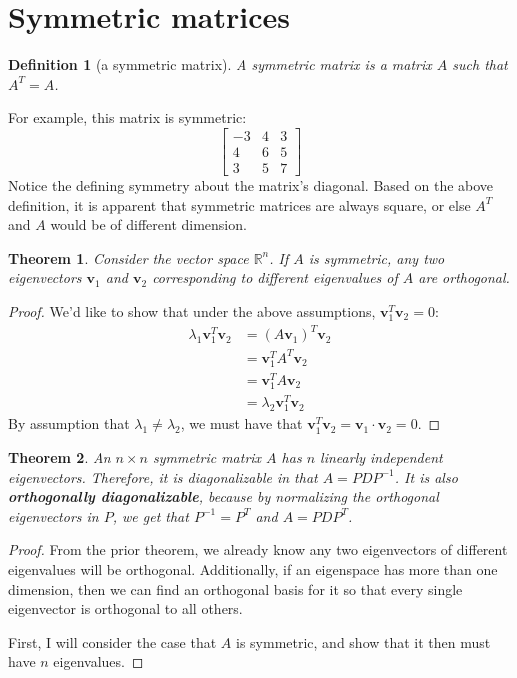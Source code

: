 \documentclass[draft,12pt]{report}
\newtheorem{theorem}{Theorem}
\newtheorem{definition}{Definition}
\renewcommand{\vec}[1]{\mathbf{#1}}
\begin{document}
\section{Symmetric matrices}

\begin{definition}[a symmetric matrix]
    A symmetric matrix is a matrix $A$ such that $A^T = A$.
\end{definition}
\noindent
For example, this matrix is symmetric:
\[ \begin{bmatrix}
    -3 & 4 & 3 \\
    4 & 6 & 5 \\
    3 & 5 & 7
\end{bmatrix} \]
Notice the defining symmetry about the matrix's diagonal. Based on the above definition, it is apparent that symmetric matrices are always square, or else $A^T$ and $A$ would be of different dimension.

\begin{theorem}
    Consider the vector space $\mathbb R^n$. If $A$ is symmetric, any two eigenvectors $\vec{v}_1$ and $\vec{v}_2$ corresponding to different eigenvalues of $A$ are orthogonal.
\end{theorem}
\begin{proof}
    We'd like to show that under the above assumptions, $\vec{v}_1^T \vec{v}_2 = 0$:
    \begin{align*}
        \lambda_1\vec{v}_1^T \vec{v}_2 &= (A\vec{v}_1)^T \vec{v}_2 \\
        &= \vec{v}_1^T A^T\vec{v}_2 \\
        &= \vec{v}_1^T A\vec{v}_2 \\
        &= \lambda_2\vec{v}_1^T \vec{v}_2
    \end{align*}
    By assumption that $\lambda_1 \neq \lambda_2$, we must have that $\vec{v}_1^T \vec{v}_2 = \vec{v}_1 \cdot \vec{v}_2 = 0$.
\end{proof}

\begin{theorem}
    An $n \times n$ symmetric matrix $A$ has $n$ linearly independent eigenvectors. Therefore, it is diagonalizable in that $A = PDP^{-1}$. It is also \textbf{orthogonally diagonalizable}, because by normalizing the orthogonal eigenvectors in $P$, we get that $P^{-1} = P^T$ and $A = PDP^T$.
\end{theorem}
\begin{proof}
    From the prior theorem, we already know any two eigenvectors of different eigenvalues will be orthogonal. Additionally, if an eigenspace has more than one dimension, then we can find an orthogonal basis for it so that every single eigenvector is orthogonal to all others.
    
    First, I will consider the case that $A$ is symmetric, and show that it then must have $n$ eigenvalues. 
\end{proof}
\end{document}

